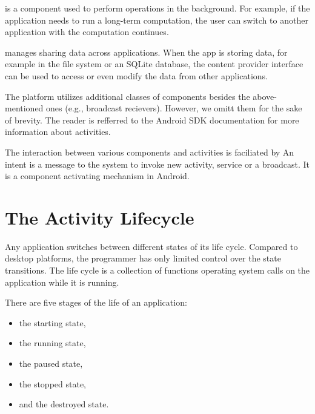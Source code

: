  is a component used to perform operations in the background.
For example, if the application needs to run a long-term computation, the user can switch to another application with the computation continues. 

 manages sharing data across applications.
When the app is storing data, for example in the file system or an SQLite database, the content provider interface can be used to access or even modify the data from other applications. 

The platform utilizes additional classes of components besides the above-mentioned ones (e.g., broadcast recievers). 
However, we omitt them for the sake of brevity. 
The reader is refferred to the Android SDK documentation for more information about activities. 

The interaction between various components and activities is faciliated by  
An intent is a message to the system to invoke new activity, service or a broadcast.
It is a component activating mechanism in Android.

\section{The Activity Lifecycle}
\label{sec:lifecycle}

Any application switches between different states of its life cycle. 
Compared to desktop platforms, the programmer has only limited control over the state transitions.
The life cycle is a collection of functions operating system calls on the application while it is running.

There are five stages of the life of an application:
\begin{itemize}
\item the starting state,
\item the running state,
\item the paused state,
\item the stopped state,
\item and the destroyed state.
\end{itemize}

